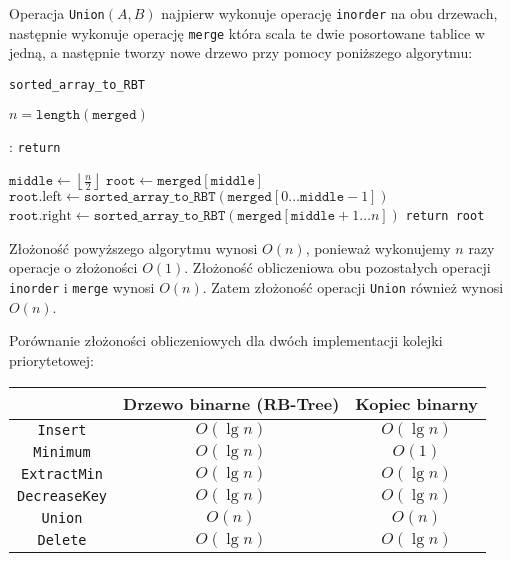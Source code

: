\documentclass[14pt]{article}
\begin{document}
Operacja \texttt{Union}$(A,B)$ najpierw wykonuje operację \texttt{inorder} na obu drzewach, następnie wykonuje operację \texttt{merge} która scala te dwie posortowane tablice w jedną, a następnie tworzy nowe drzewo przy pomocy poniższego algorytmu:

\begin{algorithm}[H]
  \caption{\texttt{sorted\_array\_to\_RBT}}
  \begin{algorithmic}[1]
    \State $n = \texttt{length}(\texttt{merged})$

    :
      \State \texttt{return}
    \EndIf

    \State $\texttt{middle} \gets \left\lfloor\frac{n}{2}\right\rfloor$
    \State $\texttt{root} \gets \texttt{merged}[\texttt{middle}]$
    \State $\texttt{root}.\mathrm{left} \gets \texttt{sorted\_array\_to\_RBT}(\texttt{merged}[0\dots\texttt{middle}-1])$
    \State $\texttt{root}.\mathrm{right} \gets \texttt{sorted\_array\_to\_RBT}(\texttt{merged}[\texttt{middle}+1\dots n])$
    \State \texttt{return root}
  \end{algorithmic}
\end{algorithm}

Złożoność powyższego algorytmu wynosi $O(n)$, ponieważ wykonujemy $n$ razy operacje o złożoności $O(1)$. Złożoność obliczeniowa obu pozostałych operacji \texttt{inorder} i \texttt{merge} wynosi $O(n)$.
Zatem złożoność operacji \texttt{Union} również wynosi $O(n)$.

Porównanie złożoności obliczeniowych dla dwóch implementacji kolejki priorytetowej:

\begin{center}
  \begin{tabular}{|c|c c|}
  \hline
   & Drzewo binarne (RB-Tree) & Kopiec binarny \\ [0.5ex]
  \hline\hline
  \texttt{Insert} & $O(\lg n)$ & $O(\lg n)$  \\
  \hline
  \texttt{Minimum} & $O(\lg n)$ & $O(1)$ \\
  \hline
  \texttt{ExtractMin} & $O(\lg n)$ & $O(\lg n)$ \\
  \hline
  \texttt{DecreaseKey} & $O(\lg n)$ & $O(\lg n)$ \\
  \hline
  \texttt{Union} & $O(n)$ & $O(n)$ \\
  \hline
  \texttt{Delete} & $O(\lg n)$ & $O(\lg n)$ \\
  \hline
  \end{tabular}
\end{center}
\end{document}
